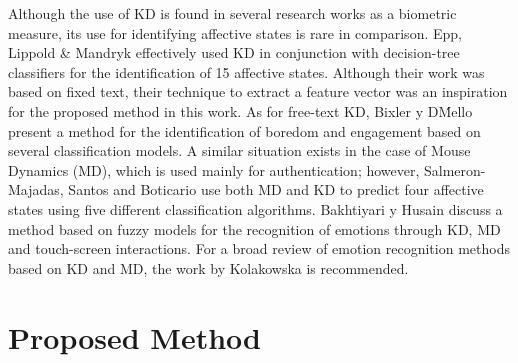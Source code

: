 \documentclass[a4paper,twoside]{article}
\begin{document}


Although the use of KD is found in several research works
as a biometric measure, its use for identifying affective states is rare in
comparison. Epp, Lippold \& Mandryk \cite{epp2011identifying} effectively used KD in conjunction
with decision-tree classifiers for the identification of 15 affective states.
Although their work was based on fixed text, their technique to extract a feature
vector was an inspiration for the proposed method in this work. As for free-text
KD, Bixler y D\'Mello \cite{bixler2013detecting} present a method for the identification of boredom
and engagement based on several classification models. A similar situation exists in the case of Mouse Dynamics (MD), which is used mainly for authentication; however, Salmeron-Majadas, Santos
and Boticario \cite{salmeron2014exploring} use both MD and KD to predict four affective states using
five different classification algorithms. Bakhtiyari y Husain \cite{bakhtiyari2014fuzzy} discuss a
method based on fuzzy models for the recognition of emotions through KD, MD and
touch-screen interactions. For a broad review of emotion recognition methods
based on KD and MD, the work by Kolakowska \cite{kolakowska2013review} is recommended.

\section{Proposed Method}
\label{sec:method}
\end{document}
